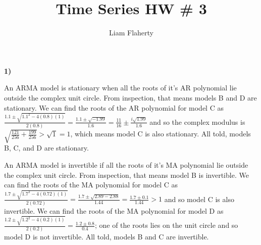 \documentclass[12pt, letterpaper]{article}
\title{Time Series HW \# 3}
\author{Liam Flaherty}
\date{\parbox{\linewidth}{\centering%
		Professor Martin\endgraf\bigskip
		NCSU: ST546-001\endgraf\bigskip
		October 2, 2024 \endgraf}}
\theoremstyle{definition}
\numberwithin{equation}{section}
\newcommand{\+}[1]{+_{\scalebox{.375}{#1}}}
\newcommand{\1}{\mathbbm{1}}
\begin{document}
\maketitle
\thispagestyle{empty}

\newpage\clearpage\noindent


\noindent\textbf{1) }

\vspace{\baselineskip}
\noindent\textbf{}
\vspace{\baselineskip}

An ARMA model is stationary when all the roots of it's AR polynomial lie outside the complex unit circle. From inspection, that means models B and D are stationary. We can find the roots of the AR polynomial for model C as $\frac{1.1 \pm \sqrt{1.1^2-4(0.8)(1)}}{2(0.8)}=\frac{1.1 \pm \sqrt{-1.99}}{1.6}=\frac{11}{16} \pm \frac{i\sqrt{1.99}}{1.6}$ and so the complex modulus is $\sqrt{\frac{121}{256}+\frac{199}{256}}>\sqrt{1}=1$, which means model C is also stationary. All told, models B, C, and D are stationary.
\vspace{\baselineskip}

An ARMA model is invertible if all the roots of it's MA polynomial lie outside the complex unit circle. From inspection, that means model B is invertible. We can find the roots of the MA polynomial for model C as $\frac{1.7 \pm \sqrt{1.7^2-4(0.72)(1)}}{2(0.72)}=\frac{1.7 \pm \sqrt{2.89-2.88}}{1.44}=\frac{1.7 \pm 0.1}{1.44}>1$ and so model C is also invertible. We can find the roots of the MA polynomial for model D as $\frac{1.2 \pm \sqrt{1.2^2-4(0.2)(1)}}{2(0.2)}=\frac{1.2 \pm 0.8}{0.4}$; one of the roots lies on the unit circle and so model D is not invertible. All told, models B and C are invertible.

\newpage
\noindent\textbf{}
\vspace{\baselineskip}
\end{document}
